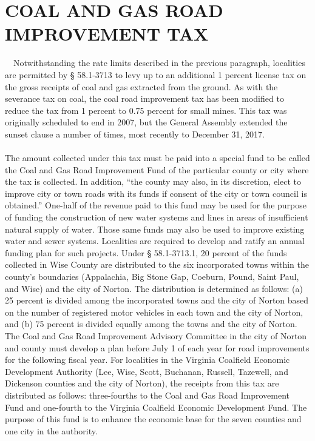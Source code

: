 \documentclass[
]{book}
\begin{document}
\hypertarget{coal-and-gas-road-improvement-tax}{%
\section{COAL AND GAS ROAD IMPROVEMENT TAX}\label{coal-and-gas-road-improvement-tax}}

~~Notwithstanding the rate limits described in the previous paragraph, localities are permitted by § 58.1-3713 to levy up to an additional 1 percent license tax on the gross receipts of coal and gas extracted from the ground. As with the severance tax on coal, the coal road improvement tax has been modified to reduce the tax from 1 percent to 0.75 percent for small mines. This tax was originally scheduled to end in 2007, but the General Assembly extended the sunset clause a number of times, most recently to December 31, 2017.\\
~\\
\hspace*{0.333em}\hspace*{0.333em}The amount collected under this tax must be paid into a special fund to be called the Coal and Gas Road Improvement Fund of the particular county or city where the tax is collected. In addition, ``the county may also, in its discretion, elect to improve city or town roads with its funds if consent of the city or town council is obtained.'' One-half of the revenue paid to this fund may be used for the purpose of funding the construction of new water systems and lines in areas of insufficient natural supply of water. Those same funds may also be used to improve existing water and sewer systems. Localities are required to develop and ratify an annual funding plan for such projects. Under § 58.1-3713.1, 20 percent of the funds collected in Wise County are distributed to the six incorporated towns within the county's boundaries (Appalachia, Big Stone Gap, Coeburn, Pound, Saint Paul, and Wise) and the city of Norton. The distribution is determined as follows: (a) 25 percent is divided among the incorporated towns and the city of Norton based on the number of registered motor vehicles in each town and the city of Norton, and (b) 75 percent is divided equally among the towns and the city of Norton. The Coal and Gas Road Improvement Advisory Committee in the city of Norton and county must develop a plan before July 1 of each year for road improvements for the following fiscal year. For localities in the Virginia Coalfield Economic Development Authority (Lee, Wise, Scott, Buchanan, Russell, Tazewell, and Dickenson counties and the city of Norton), the receipts from this tax are distributed as follows: three-fourths to the Coal and Gas Road Improvement Fund and one-fourth to the Virginia Coalfield Economic Development Fund. The purpose of this fund is to enhance the economic base for the seven counties and one city in the authority.
\end{document}
